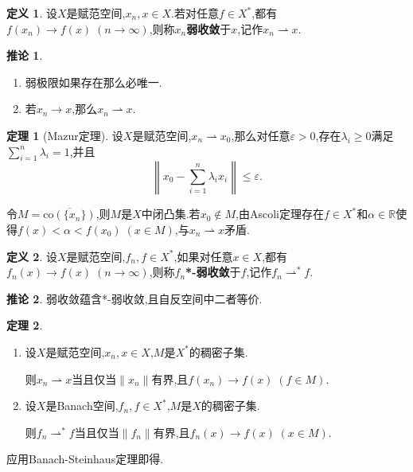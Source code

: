 \documentclass{ctexart}
\theoremstyle{definition}
\newtheorem{definition}{定义}
\newtheorem{theorem}{定理}
\newtheorem{corollary}{推论}
\theoremstyle{remark}
\newenvironment{proofsketch}{
  \renewcommand{\proofname}{证明概要}\proof}{\endproof}
\begin{document}
	\begin{definition}
		设$X$是赋范空间,$x_n,x\in X$.若对任意$f\in X^*$,都有$f(x_n)\to f(x)\;(n\to\infty)$,则称$x_n$\textbf{弱收敛}于$x$,记作$x_n\rightharpoonup x$.
	\end{definition}
	\begin{corollary}
		\begin{enumerate}
			\item 弱极限如果存在那么必唯一.
			\item 若$x_n\to x$,那么$x_n\rightharpoonup x$.
		\end{enumerate}
	\end{corollary}
	\begin{theorem}[Mazur定理]
		设$X$是赋范空间,$x_n\rightharpoonup x_0$,那么对任意$\varepsilon>0$,存在$\lambda_i\ge 0$满足$\sum_{i=1}^n{\lambda_i}=1$,并且
		$$\left\|x_0-\sum_{i=1}^n{\lambda_i x_i}\right\|\le\varepsilon.$$
	\end{theorem}
	\begin{proofsketch}
		令$M=\overline{\mathrm{co}(\{x_n\})}$,则$M$是$X$中闭凸集.若$x_0\notin M$,由Ascoli定理存在$f\in X^*$和$\alpha\in\mathbb{R}$使得$f(x)<\alpha<f(x_0)\;(x\in M)$,与$x_n\rightharpoonup x$矛盾.
	\end{proofsketch}
	\begin{definition}
		设$X$是赋范空间,$f_n,f\in X^*$,如果对任意$x\in X$,都有$f_n(x)\to f(x)\;(n\to\infty)$,则称$f_n$\;\textbf{*-弱收敛}于$f$,记作$f_n\rightharpoonup^*f$.
	\end{definition}
	\begin{corollary}
		弱收敛蕴含*-弱收敛,且自反空间中二者等价.
	\end{corollary}
	\begin{theorem}\label{theorem-weak-convergence}
		\begin{enumerate}
			\item 设$X$是赋范空间,$x_n,x\in X$,$M$是$X^*$的稠密子集.
			
			则$x_n\rightharpoonup x$当且仅当$\|x_n\|$有界,且$f(x_n)\to f(x)\;(f\in M)$.
			
			\item 设$X$是Banach空间,$f_n,f\in X^*$,$M$是$X$的稠密子集.
			
			则$f_n\rightharpoonup^* f$当且仅当$\|f_n\|$有界,且$f_n(x)\to f(x)\;(x\in M)$.
		\end{enumerate}
	\end{theorem}
	\begin{proofsketch}
		应用Banach-Steinhaus定理即得.
	\end{proofsketch}
	
\end{document}
